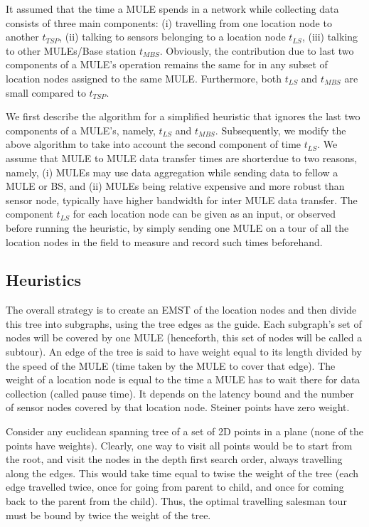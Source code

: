 It assumed that the time a MULE spends in a network while collecting data
consists of three main components: (i) travelling from one location node to another $t_{TSP}$, (ii) talking to sensors belonging to a location node $t_{LS}$, (iii) talking to other MULEs/Base station $t_{MBS}$. Obviously, the 
contribution due to last two components of a MULE's operation remains
the same for in any subset of location nodes assigned to the same MULE. 
Furthermore, both $t_{LS}$ and $t_{MBS}$ are small compared to $t_{TSP}$. 

We first describe the algorithm for a simplified heuristic that ignores the last two components of a MULE's, namely, $t_{LS}$ and $t_{MBS}$. Subsequently, we modify the above algorithm to take into account the second component of time $t_{LS}$. We assume that MULE to MULE data transfer times are shorterdue to two reasons, namely, (i) MULEs may use data aggregation while sending data to fellow a MULE or BS, and (ii) MULEs being relative expensive and more robust than sensor node, typically have higher bandwidth for inter MULE data transfer. The component $t_{LS}$ for each location node can be given as an input, or observed before running the heuristic, by simply sending one MULE on a tour of all the location nodes in the field to measure and record such times beforehand.


\subsection{Heuristics}

The overall strategy is to create an EMST of the location nodes and then divide this tree into subgraphs, using the tree edges as the guide. Each subgraph's set of nodes will be covered by one MULE (henceforth, this set of nodes will be called a subtour). An edge of the tree is said to have weight equal to its length divided by the speed of the MULE (time taken by the MULE to cover that edge). The weight of a location node is equal to the time a MULE has to wait there for data collection (called pause time). It depends on the latency bound and the number of sensor nodes covered by that location node. Steiner points have zero weight.

Consider any euclidean spanning tree of a set of 2D points in a plane (none of the points have weights). Clearly, one way to visit all points would be to start from the root, and visit the nodes in the depth first search order, always travelling along the edges. This would take time equal to twise the weight of the tree (each edge travelled twice, once for going from parent to child, and once for coming back to the parent from the child). Thus, the optimal travelling salesman tour must be bound by twice the weight of the tree.

